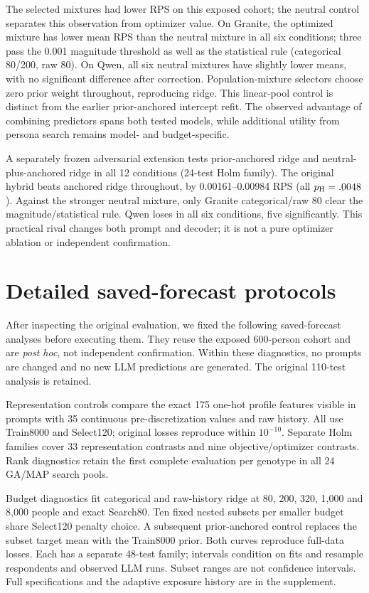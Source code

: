 \documentclass[sigconf,anonymous]{aamas}
\begin{document}
The selected mixtures had lower RPS on this exposed cohort; the neutral
control separates this observation from optimizer value. On Granite, the optimized mixture has lower
mean RPS than the neutral mixture in all six conditions; three pass the
0.001 magnitude threshold as well as the statistical rule (categorical 80/200,
raw 80). On Qwen, all six neutral mixtures have slightly lower means, with no
significant difference after correction. Population-mixture selectors choose
zero prior weight throughout, reproducing ridge. This linear-pool control is
distinct from the earlier prior-anchored intercept refit. The observed advantage of combining predictors spans both tested models,
while additional utility from persona search remains model- and budget-specific.

A separately frozen adversarial extension tests prior-anchored ridge and
neutral-plus-anchored ridge in all 12 conditions (24-test Holm family).
The original hybrid beats anchored ridge throughout, by 0.00161--0.00984 RPS
(all $p_{\rm H}=.0048$). Against the stronger neutral mixture, only Granite
categorical/raw 80 clear the magnitude/statistical rule. Qwen loses in all
six conditions, five significantly. This practical rival changes both prompt
and decoder; it is not a pure optimizer ablation or independent confirmation.




\section{Detailed saved-forecast protocols}
After inspecting the original evaluation, we fixed the following saved-forecast
analyses before executing them. They reuse the exposed 600-person cohort and
are \emph{post hoc}, not independent confirmation. Within these diagnostics,
no prompts are changed and no new LLM predictions are generated. The original
110-test analysis is retained.

Representation controls compare the exact 175 one-hot profile features
visible in prompts with 35 continuous pre-discretization values and raw
history. All use Train8000 and Select120; original losses reproduce within
$10^{-10}$. Separate Holm families cover 33 representation contrasts and
nine objective/optimizer contrasts. Rank diagnostics retain the first
complete evaluation per genotype in all 24 GA/MAP search pools.

Budget diagnostics fit categorical and raw-history ridge at 80, 200, 320,
1,000 and 8,000 people and exact Search80. Ten fixed nested subsets per
smaller budget share Select120 penalty choice. A subsequent prior-anchored
control replaces the subset target mean with the Train8000 prior. Both
curves reproduce full-data losses. Each has a separate 48-test family;
intervals condition on fits and resample respondents and observed LLM runs.
Subset ranges are not confidence intervals. Full specifications and the
adaptive exposure history are in the supplement.
\end{document}

